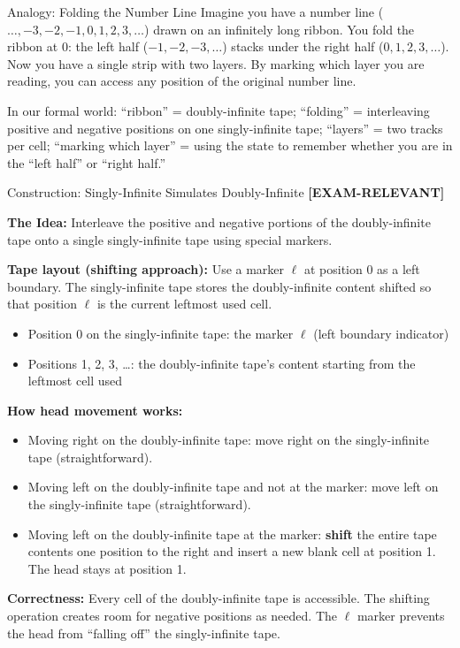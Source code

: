 \documentclass[11pt,a4paper]{article}
\newcommand{\kemark}{\textcolor{red!70!black}{\textbf{[EXAM-RELEVANT]}}}
\begin{document}
\begin{notebox}{Analogy: Folding the Number Line}
Imagine you have a number line ($\ldots, -3, -2, -1, 0, 1, 2, 3, \ldots$) drawn on an infinitely long ribbon. You fold the ribbon at 0: the left half ($-1, -2, -3, \ldots$) stacks under the right half ($0, 1, 2, 3, \ldots$). Now you have a single strip with two layers. By marking which layer you are reading, you can access any position of the original number line.

In our formal world: ``ribbon'' = doubly-infinite tape; ``folding'' = interleaving positive and negative positions on one singly-infinite tape; ``layers'' = two tracks per cell; ``marking which layer'' = using the state to remember whether you are in the ``left half'' or ``right half.''
\end{notebox}

\begin{definitionbox}{{Construction: Singly-Infinite Simulates Doubly-Infinite} \kemark}

\textbf{The Idea:}
Interleave the positive and negative portions of the doubly-infinite tape onto a single singly-infinite tape using special markers.

\textbf{Tape layout (shifting approach):}
Use a marker $\ell$ at position 0 as a left boundary. The singly-infinite tape stores the doubly-infinite content shifted so that position $\ell$ is the current leftmost used cell.

\begin{itemize}[nosep]
\item Position 0 on the singly-infinite tape: the marker $\ell$ (left boundary indicator)
\item Positions 1, 2, 3, \ldots: the doubly-infinite tape's content starting from the leftmost cell used
\end{itemize}

\textbf{How head movement works:}
\begin{itemize}[nosep]
\item Moving right on the doubly-infinite tape: move right on the singly-infinite tape (straightforward).
\item Moving left on the doubly-infinite tape and not at the marker: move left on the singly-infinite tape (straightforward).
\item Moving left on the doubly-infinite tape at the marker: \textbf{shift} the entire tape contents one position to the right and insert a new blank cell at position 1. The head stays at position 1.
\end{itemize}

\textbf{Correctness:} Every cell of the doubly-infinite tape is accessible. The shifting operation creates room for negative positions as needed. The $\ell$ marker prevents the head from ``falling off'' the singly-infinite tape.
\end{definitionbox}
\end{document}
